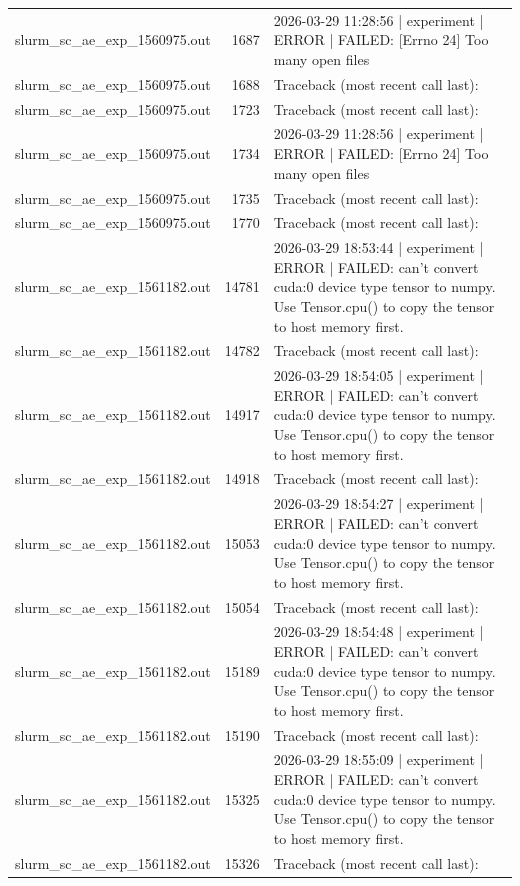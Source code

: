 \begin{tabular}{lrl}
slurm\_sc\_ae\_exp\_1560975.out & 1687 & 2026-03-29 11:28:56 | experiment | ERROR |   FAILED: [Errno 24] Too many open files \\
slurm\_sc\_ae\_exp\_1560975.out & 1688 & Traceback (most recent call last): \\
slurm\_sc\_ae\_exp\_1560975.out & 1723 & Traceback (most recent call last): \\
slurm\_sc\_ae\_exp\_1560975.out & 1734 & 2026-03-29 11:28:56 | experiment | ERROR |   FAILED: [Errno 24] Too many open files \\
slurm\_sc\_ae\_exp\_1560975.out & 1735 & Traceback (most recent call last): \\
slurm\_sc\_ae\_exp\_1560975.out & 1770 & Traceback (most recent call last): \\
slurm\_sc\_ae\_exp\_1561182.out & 14781 & 2026-03-29 18:53:44 | experiment | ERROR |   FAILED: can't convert cuda:0 device type tensor to numpy. Use Tensor.cpu() to copy the tensor to host memory first. \\
slurm\_sc\_ae\_exp\_1561182.out & 14782 & Traceback (most recent call last): \\
slurm\_sc\_ae\_exp\_1561182.out & 14917 & 2026-03-29 18:54:05 | experiment | ERROR |   FAILED: can't convert cuda:0 device type tensor to numpy. Use Tensor.cpu() to copy the tensor to host memory first. \\
slurm\_sc\_ae\_exp\_1561182.out & 14918 & Traceback (most recent call last): \\
slurm\_sc\_ae\_exp\_1561182.out & 15053 & 2026-03-29 18:54:27 | experiment | ERROR |   FAILED: can't convert cuda:0 device type tensor to numpy. Use Tensor.cpu() to copy the tensor to host memory first. \\
slurm\_sc\_ae\_exp\_1561182.out & 15054 & Traceback (most recent call last): \\
slurm\_sc\_ae\_exp\_1561182.out & 15189 & 2026-03-29 18:54:48 | experiment | ERROR |   FAILED: can't convert cuda:0 device type tensor to numpy. Use Tensor.cpu() to copy the tensor to host memory first. \\
slurm\_sc\_ae\_exp\_1561182.out & 15190 & Traceback (most recent call last): \\
slurm\_sc\_ae\_exp\_1561182.out & 15325 & 2026-03-29 18:55:09 | experiment | ERROR |   FAILED: can't convert cuda:0 device type tensor to numpy. Use Tensor.cpu() to copy the tensor to host memory first. \\
slurm\_sc\_ae\_exp\_1561182.out & 15326 & Traceback (most recent call last): \\

\end{tabular}

